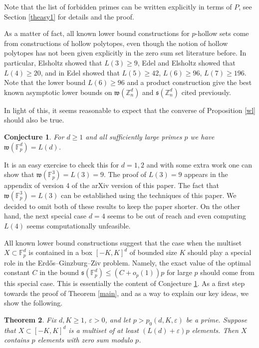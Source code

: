 \documentclass{daj}
\renewcommand{\le}{\leqslant}
\renewcommand{\ge}{\geqslant}
\newcommand{\s}{\mathfrak s}
\newcommand{\w}{\mathfrak w}
\newcommand{\Z}{\mathbb Z}
\newcommand{\FF}{\mathbb F}
\newtheorem{theorem}{Theorem}[section]
\newtheorem{conj}[theorem]{Conjecture}
\theoremstyle{definition}
\theoremstyle{remark}
\theoremstyle{definition}
\theoremstyle{definition}
\begin{document}
Note that the list of forbidden primes can be written explicitly in terms of $P$, see Section \ref{theasy1} for details and the proof. 

As a matter of fact, all known lower bound constructions for $p$-hollow sets come from constructions of hollow polytopes, even though the notion of hollow polytopes has not been given explicitly in the zero sum set literature before.
In particular, Elsholtz \cite{El1} showed that $L(3) \ge 9$, Edel \cite{Ed} and Elsholtz \cite{El2} showed that $L(4) \ge 20$, and in \cite{Ed2} Edel showed that $L(5) \ge 42$, $L(6) \ge 96$, $L(7) \ge 196$. Note that the lower bound $L(6) \ge 96$ and a product construction give the best known asymptotic lower bounds on $\w(\Z_n^d)$ and $\s(\Z_n^d)$ cited previously.

In light of this, it seems reasonable to expect that the converse of Proposition \ref{wl} should also be true.

\begin{conj}\label{conj}
For $d \ge 1$ and all sufficiently large primes $p$ we have $\w(\FF_p^d) = L(d)$.
\end{conj}

It is an easy exercise to check this for $d=1, 2$ and with some extra work one can show that $\w(\FF_p^3) = L(3) = 9$. The proof of $L(3)=9$ appears in the appendix of version 4 of the arXiv version of this paper. The fact that $\w(\FF_p^3) = L(3) $ can be established using the techniques of this paper. We decided to omit both of these results to keep the paper shorter. On the other hand, the next special case $d=4$ seems to be out of reach and even computing $L(4)$ seems computationally unfeasible.


All known lower bound constructions suggest that the case when the multiset $X \subset \FF_p^d$ is contained in a box $[-K, K]^d$ of bounded size $K$ should play a special role in the Erd{\H o}s--Ginzburg--Ziv problem. Namely, the exact value of the optimal constant $C$ in the bound $\s(\FF_p^d) \le (C+o_p(1)) p $ for large $p$ should come from this special case. This is essentially the content of Conjecture \ref{conj}. As a first step towards the proof of Theorem \ref{main}, and as a way to explain our key ideas, we show the following.


\begin{theorem}\label{thbounded}
    Fix $d, K \ge 1$, $\varepsilon>0$, and let $p > p_0(d, K, \varepsilon)$ be a prime. Suppose that $X \subset [-K, K]^d$ is a multiset of at least $(L(d)+\varepsilon) p$ elements. Then $X$ contains $p$ elements with zero sum modulo $p$.
\end{theorem}
\end{document}

